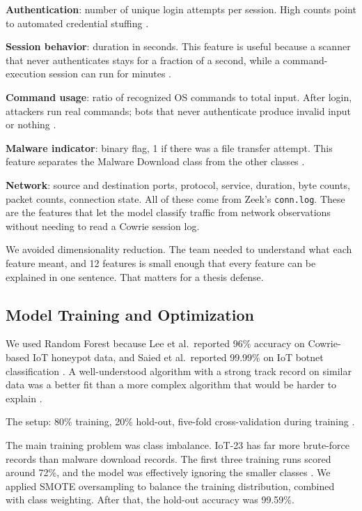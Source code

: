 \textbf{Authentication}: number of unique login attempts per session. High counts point to automated credential stuffing \cite{203628,famera2025mirai,9558948}.

\textbf{Session behavior}: duration in seconds. This feature is useful because a scanner that never authenticates stays for a fraction of a second, while a command-execution session can run for minutes \cite{lee2021classification,karim2024efficient}.

\textbf{Command usage}: ratio of recognized OS commands to total input. After login, attackers run real commands; bots that never authenticate produce invalid input or nothing \cite{9071014,dimauro2021supervised}.

\textbf{Malware indicator}: binary flag, 1 if there was a file transfer attempt. This feature separates the Malware Download class from the other classes \cite{9071014,9558948}.

\textbf{Network}: source and destination ports, protocol, service, duration, byte counts, packet counts, connection state. All of these come from Zeek's \texttt{conn.log}. These are the features that let the model classify traffic from network observations without needing to read a Cowrie session log.

We avoided dimensionality reduction. The team needed to understand what each feature meant, and 12 features is small enough that every feature can be explained in one sentence. That matters for a thesis defense.

\subsection{Model Training and Optimization}
\label{subsec:model_training}

We used Random Forest because Lee et al.\ reported 96\% accuracy on Cowrie-based IoT honeypot data, and Saied et al.\ reported 99.99\% on IoT botnet classification \cite{lee2021classification,saied2023comparative}. A well-understood algorithm with a strong track record on similar data was a better fit than a more complex algorithm that would be harder to explain \cite{karim2024efficient,christy2024iot}.

The setup: 80\% training, 20\% hold-out, five-fold cross-validation during training \cite{optimized2024arxiv,karim2024efficient}.

The main training problem was class imbalance. IoT-23 has far more brute-force records than malware download records. The first three training runs scored around 72\%, and the model was effectively ignoring the smaller classes \cite{9213728,9912910,abdulsalam2023multiclass}. We applied SMOTE oversampling to balance the training distribution, combined with class weighting. After that, the hold-out accuracy was 99.59\%.

